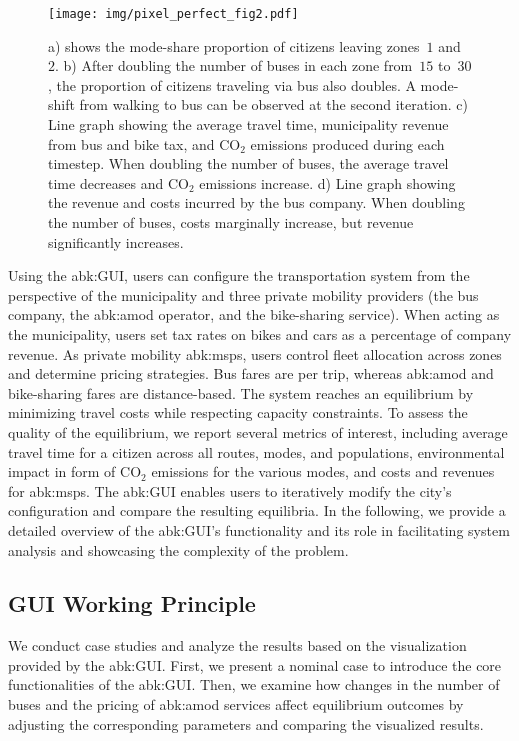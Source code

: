\begin{figure}[h]
    \centering
    \texttt{[image: img/pixel\_perfect\_fig2.pdf]}
    \caption{a) shows the mode-share proportion of citizens leaving zones~$1$ and~$2$. b) After doubling the number of buses in each zone from~$15$ to~$30$, the proportion of citizens traveling via bus also doubles. A mode-shift from walking to bus can be observed at the second iteration. c) Line graph showing the average travel time, municipality revenue from bus and bike tax, and CO$_2$ emissions produced during each timestep. When doubling the number of buses, the average travel time decreases and CO$_2$ emissions increase. d) Line graph showing the revenue and costs incurred by the bus company. When doubling the number of buses, costs marginally increase, but revenue significantly increases.}
    \label{fig:double_num_buses}
\end{figure}

\noindent Using the \gls{abk:GUI}, users can configure the transportation system from the perspective of the municipality and three private mobility providers (the bus company, the \gls{abk:amod} operator, and the bike-sharing service). 
When acting as the municipality, users set tax rates on bikes and cars as a percentage of company revenue. 
As private mobility \glspl{abk:msp}, users control fleet allocation across zones and determine pricing strategies. 
Bus fares are per trip, whereas \gls{abk:amod} and bike-sharing fares are distance-based.
%
The system reaches an equilibrium by minimizing travel costs while respecting capacity constraints. 
To assess the quality of the equilibrium, we report several metrics of interest, including average travel time for a citizen across all routes, modes, and populations, environmental impact in form of CO$_2$ emissions for the various modes, and costs and revenues for \glspl{abk:msp}.
The \gls{abk:GUI} enables users to iteratively modify the city's configuration and compare the resulting equilibria. 
In the following, we provide a detailed overview of the \gls{abk:GUI}'s functionality and its role in facilitating system analysis and showcasing the complexity of the problem.

\subsection{GUI Working Principle}
We conduct case studies and analyze the results based on the visualization provided by the \gls{abk:GUI}. 
First, we present a nominal case to introduce the core functionalities of the \gls{abk:GUI}. 
Then, we examine how changes in the number of buses and the pricing of \gls{abk:amod} services affect equilibrium outcomes by adjusting the corresponding parameters and comparing the visualized results.
%


